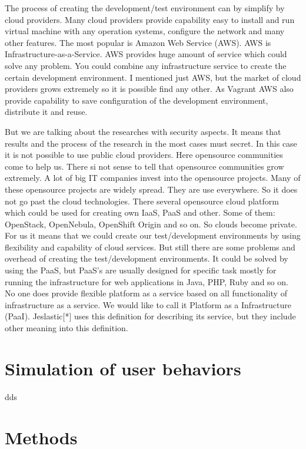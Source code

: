 \documentclass[twoside]{article}
\begin{document}
The process of creating the development/test environment can by simplify by cloud providers. Many cloud providers provide capability easy to install and run virtual machine with any operation systems, configure the network and many other features. The most popular is Amazon Web Service (AWS). AWS is Infrastructure-as-a-Service. AWS provides huge amount of service which could solve any problem.  You could combine any infrastructure service to create the certain development environment. I mentioned just AWS, but the market of cloud providers grows extremely so it is possible find any other. As Vagrant AWS also provide capability to save configuration of the development environment, distribute it and reuse.

But we are talking about the researches with security aspects. It means that results and the process of the research in the most cases must secret. In this case it is not possible to use public cloud providers. Here opensource communities come to help us. There si not sense to tell that opensource communities grow extremely. A lot of big IT companies invest into the opensource projects. Many of these opensource projects are widely spread. They are use everywhere. So it does not go past the cloud technologies. There several opensource cloud platform which could be used for creating own IaaS, PaaS and other. Some of them: OpenStack, OpenNebula,  OpenShift Origin and so on. So clouds become private. For us it means that we could create our test/development environments by using flexibility and capability of cloud services. But still there are some problems and overhead of creating the test/development environments. It could be solved by using the PaaS, but PaaS's are usually designed for specific task mostly for running the infrastructure for web applications in Java, PHP, Ruby and so on. No one does provide flexible platform as a service based on all functionality of infrastructure as a service. We would like to call it Platform as a Infrastructure (PaaI). Jeslastic[*] uses this definition for describing its service, but they include other meaning into this definition.     

        


\section{Simulation of user behaviors}
dds  

\section{Methods}
\end{document}
